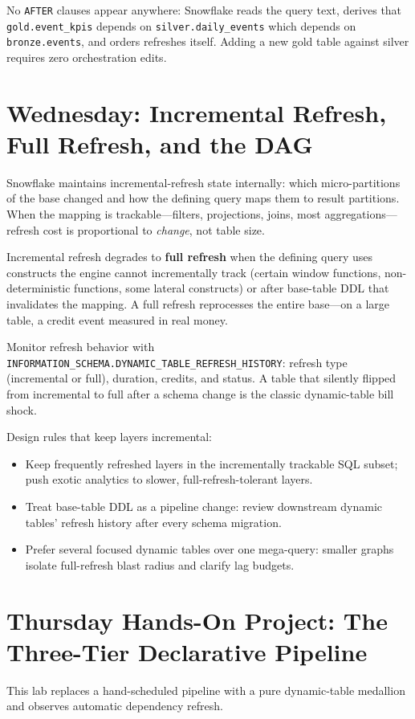 No \texttt{AFTER} clauses appear anywhere: Snowflake reads the query text, derives that \texttt{gold.event\_kpis} depends on \texttt{silver.daily\_events} which depends on \texttt{bronze.events}, and orders refreshes itself. Adding a new gold table against silver requires zero orchestration edits.

\section{Wednesday: Incremental Refresh, Full Refresh, and the DAG}
Snowflake maintains incremental-refresh state internally: which micro-partitions of the base changed and how the defining query maps them to result partitions. When the mapping is trackable---filters, projections, joins, most aggregations---refresh cost is proportional to \emph{change}, not table size.

Incremental refresh degrades to \textbf{full refresh} when the defining query uses constructs the engine cannot incrementally track (certain window functions, non-deterministic functions, some lateral constructs) or after base-table DDL that invalidates the mapping. A full refresh reprocesses the entire base---on a large table, a credit event measured in real money.

\begin{notebox}
Monitor refresh behavior with \texttt{INFORMATION\_SCHEMA.DYNAMIC\_TABLE\_REFRESH\_HISTORY}: refresh type (incremental or full), duration, credits, and status. A table that silently flipped from incremental to full after a schema change is the classic dynamic-table bill shock.
\end{notebox}

Design rules that keep layers incremental:
\begin{itemize}
    \item Keep frequently refreshed layers in the incrementally trackable SQL subset; push exotic analytics to slower, full-refresh-tolerant layers.
    \item Treat base-table DDL as a pipeline change: review downstream dynamic tables' refresh history after every schema migration.
    \item Prefer several focused dynamic tables over one mega-query: smaller graphs isolate full-refresh blast radius and clarify lag budgets.
\end{itemize}

\section{Thursday Hands-On Project: The Three-Tier Declarative Pipeline}
This lab replaces a hand-scheduled pipeline with a pure dynamic-table medallion and observes automatic dependency refresh.

